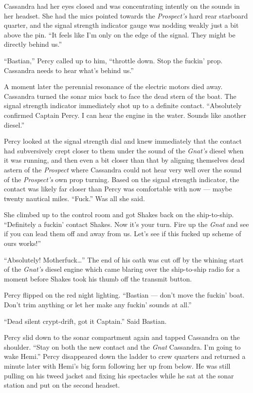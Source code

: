 \documentclass[
]{scrbook}
\begin{document}
Cassandra had her eyes closed and was concentrating intently on the
sounds in her headset. She had the mics pointed towards the
\emph{Prospect's} hard rear starboard quarter, and the signal strength
indicator gauge was nodding weakly just a bit above the pin. ``It feels
like I'm only on the edge of the signal. They might be directly behind
us.''

``Bastian,'' Percy called up to him, ``throttle down. Stop the fuckin'
prop. Cassandra needs to hear what's behind us.''

A moment later the perennial resonance of the electric motors died away.
Cassandra turned the sonar mics back to face the dead stern of the boat.
The signal strength indicator immediately shot up to a definite contact.
``Absolutely confirmed Captain Percy. I can hear the engine in the
water. Sounds like another diesel.''

Percy looked at the signal strength dial and knew immediately that the
contact had subversively crept closer to them under the sound of the
\emph{Gnat's} diesel when it was running, and then even a bit closer
than that by aligning themselves dead astern of the \emph{Prospect}
where Cassandra could not hear very well over the sound of the
\emph{Prospect's} own prop turning. Based on the signal strength
indicator, the contact was likely far closer than Percy was comfortable
with now --- maybe twenty nautical miles. ``Fuck.'' Was all she said.

She climbed up to the control room and got Shakes back on the
ship-to-ship. ``Definitely a fuckin' contact Shakes. Now it's your turn.
Fire up the \emph{Gnat} and see if you can lead them off and away from
us. Let's see if this fucked up scheme of ours works!''

``Absolutely! Motherfuck\ldots{}'' The end of his oath was cut off by
the whining start of the \emph{Gnat's} diesel engine which came blaring
over the ship-to-ship radio for a moment before Shakes took his thumb
off the transmit button.

Percy flipped on the red night lighting. ``Bastian --- don't move the
fuckin' boat. Don't trim anything or let her make any fuckin' sounds at
all.''

``Dead silent crypt-drift, got it Captain.'' Said Bastian.

Percy slid down to the sonar compartment again and tapped Cassandra on
the shoulder. ``Stay on both the new contact and the \emph{Gnat}
Cassandra. I'm going to wake Hemi.'' Percy disappeared down the ladder
to crew quarters and returned a minute later with Hemi's big form
following her up from below. He was still pulling on his tweed jacket
and fixing his spectacles while he sat at the sonar station and put on
the second headset.
\end{document}
